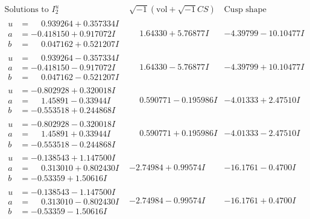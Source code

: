 \documentclass[1p]{elsarticle_modified}
\theoremstyle{definition}
\newcommand{\I}{\sqrt{-1}}
\begin{document}
$$\begin{array}{c|c|c}  
\text{Solutions to }I^u_{2}& \I (\text{vol} + \sqrt{-1}CS) & \text{Cusp shape}\\
 \hline 
\begin{aligned}
u &= \phantom{-}0.939264 + 0.357334 I \\
a &= -0.418150 + 0.917072 I \\
b &= \phantom{-}0.047162 + 0.521207 I\end{aligned}
 & \phantom{-}1.64330 + 5.76877 I & -4.39799 - 10.10477 I \\ \hline\begin{aligned}
u &= \phantom{-}0.939264 - 0.357334 I \\
a &= -0.418150 - 0.917072 I \\
b &= \phantom{-}0.047162 - 0.521207 I\end{aligned}
 & \phantom{-}1.64330 - 5.76877 I & -4.39799 + 10.10477 I \\ \hline\begin{aligned}
u &= -0.802928 + 0.320018 I \\
a &= \phantom{-}1.45891 - 0.33944 I \\
b &= -0.553518 + 0.244868 I\end{aligned}
 & \phantom{-}0.590771 - 0.195986 I & -4.01333 + 2.47510 I \\ \hline\begin{aligned}
u &= -0.802928 - 0.320018 I \\
a &= \phantom{-}1.45891 + 0.33944 I \\
b &= -0.553518 - 0.244868 I\end{aligned}
 & \phantom{-}0.590771 + 0.195986 I & -4.01333 - 2.47510 I \\ \hline\begin{aligned}
u &= -0.138543 + 1.147500 I \\
a &= \phantom{-}0.313010 + 0.802430 I \\
b &= -0.53359 + 1.50616 I\end{aligned}
 & -2.74984 + 0.99574 I & -16.1761 - 0.4700 I \\ \hline\begin{aligned}
u &= -0.138543 - 1.147500 I \\
a &= \phantom{-}0.313010 - 0.802430 I \\
b &= -0.53359 - 1.50616 I\end{aligned}
 & -2.74984 - 0.99574 I & -16.1761 + 0.4700 I \\ \hline\begin{aligned}

\end{aligned}
\end{array}$$
\end{document}
